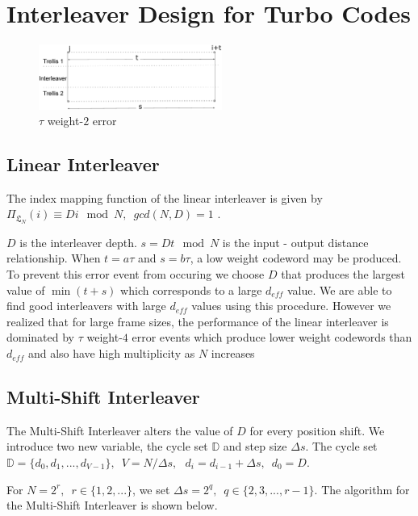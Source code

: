 \documentclass[twoside]{jarticle}
\begin{document}
\section{Interleaver Design for Turbo Codes}
\begin{center}
\begin{figure}[h!]
\includegraphics[width=6cm]{weight2.eps}
\caption{$\tau$ weight-$2$ error }
\label{2_error}
\end{figure}
\end{center}
\vspace{-8mm}

\subsection{Linear Interleaver}
The index mapping function of the  linear interleaver is given by 
$ \Pi_{\mathfrak{L}_N}(i) \equiv Di \mod N,  \,\,\, gcd(N,D)=1$ .

$D$ is the interleaver depth. $s = Dt \mod N$ is the input - output distance relationship.
When $t=a\tau$ and $s=b\tau$, a low weight codeword may be produced. To prevent this error event from occuring we choose $D$ that produces the largest value of $\min{( t+s)}$ which  corresponds to a large $d_{eff}$ value. We are able to find good interleavers with large $d_{eff}$ values using this procedure. However we realized that for large frame sizes, the performance of the linear interleaver is dominated by $\tau$ weight-$4$ error events which produce lower weight codewords than $d_{eff}$ and also have high multiplicity as $N$ increases

\vspace{-3mm}
\subsection{Multi-Shift Interleaver}
\vspace{-2mm}
The Multi-Shift Interleaver alters the value of $D$ for every position shift.  
We introduce two new variable, the cycle set $\mathbb{D}$ and step size $\Delta s$. 
  The cycle set $\mathbb{D}=\{d_0,d_1,...,d_{V-1}\},\,\,\, V=N/\Delta s, \,\,\,\, d_i=d_{i-1}+\Delta s, \,\,\, d_0=D$. 
  
 For $N=2^r, \,\,\, r\in \{1,2,...\}$, we set $\Delta s = 2^q, \,\,\, q \in \{2,3,...,r-1\}$. The algorithm for the Multi-Shift Interleaver is shown below.
 
\end{document}
